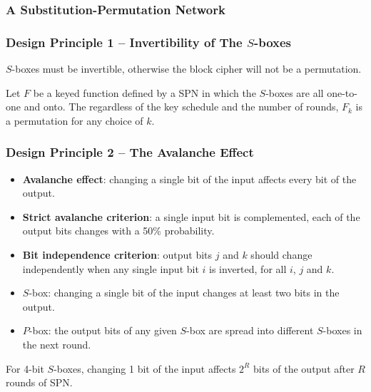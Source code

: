 \begin{frame}\frametitle{A Substitution-Permutation Network}
\begin{figure}
\begin{center}

\end{center}
\end{figure}
\end{frame}
\begin{frame}\frametitle{Design Principle 1 -- Invertibility of The $S$-boxes}
$S$-boxes must be invertible, otherwise the block cipher will not be a permutation.
\begin{proposition}
Let $F$ be a keyed function defined by a SPN in which the $S$-boxes are all one-to-one and onto. The regardless of the key schedule and the number of rounds, $F_k$ is a permutation for any choice of $k$.
\end{proposition}
\end{frame}
\begin{frame}\frametitle{Design Principle 2 -- The Avalanche Effect}
\begin{itemize}
\item \textbf{Avalanche effect}: changing a single bit of the input affects every bit of the output.
\item \textbf{Strict avalanche criterion}: a single input bit is complemented, each of the output bits changes with a 50\% probability.
\item \textbf{Bit independence criterion}: output bits $j$ and $k$ should change independently when any single input bit $i$ is inverted, for all $i$, $j$ and $k$.
\item $S$-box: changing a single bit of the input changes at least two bits in the output.
\item $P$-box: the output bits of any given $S$-box are spread into different $S$-boxes in the next round.
\end{itemize}
\begin{exampleblock}{}
For 4-bit $S$-boxes, changing 1 bit of the input affects $2^R$ bits of the output after $R$ rounds of SPN.
\end{exampleblock}
\end{frame}
